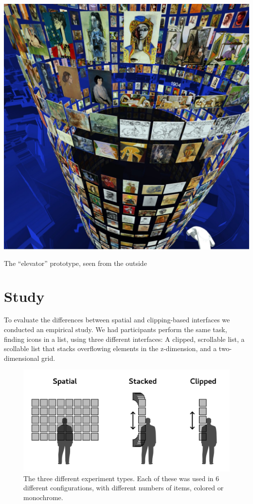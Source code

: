 \documentclass{tufte-book} %
\begin{document}
\begin{marginfigure}
  \includegraphics[width=\linewidth]{picassooutside.jpg}
  \caption{The ``elevator'' prototype, seen from the outside}
  \label{fig:picassooutside}
\end{marginfigure}



\chapter{Study}
\label{ch:study}

To evaluate the differences between spatial and clipping-based interfaces we conducted an empirical study. We had participants perform the same task, finding icons in a list, using three different interfaces: A clipped, scrollable list, a scollable list that stacks overflowing elements in the z-dimension, and a two-dimensional grid.

\begin{figure}
  \includegraphics{types.png}
  \caption{The three different experiment types. Each of these was used in 6 different configurations, with different numbers of items, colored or monochrome.}
  \label{fig:experiement-types}
\end{figure}
\end{document}
